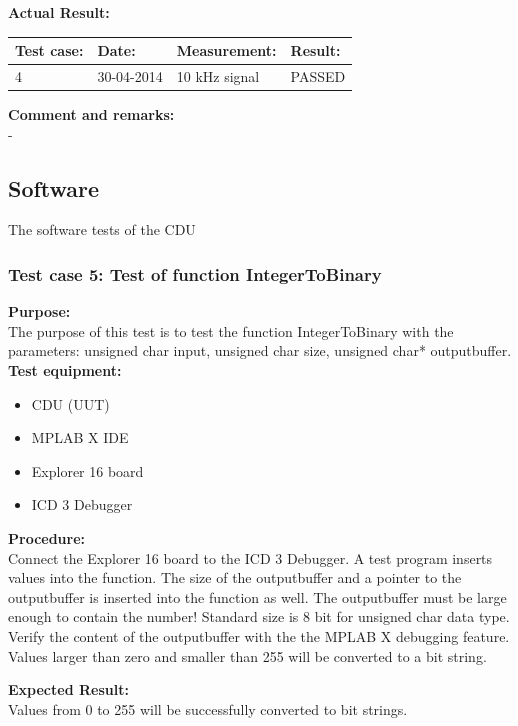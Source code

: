 \textbf{Actual Result:}\\
\begin{table}[H]
\centering
\begin{tabular}{|p{2cm}|p{2cm}|p{3cm}|p{2cm}|}\hline
\textbf{Test case:} & \textbf{Date:} & \textbf{Measurement:} & \textbf{Result:} \\ \hline
4 & 30-04-2014 & 10 kHz signal & PASSED \\ \hline
\end{tabular}
\end{table}

\textbf{Comment and remarks:}\\
-\\

\subsection{Software}
The software tests of the CDU
\subsubsection{Test case 5: Test of function IntegerToBinary }
\textbf{Purpose:}\\
The purpose of this test is to test the function IntegerToBinary with the parameters: unsigned char input, unsigned char size, unsigned char* outputbuffer.\\

\textbf{Test equipment:}
\begin{itemize}
\item CDU (UUT)
\item MPLAB X IDE
\item Explorer 16 board
\item ICD 3 Debugger
\end{itemize}

\textbf{Procedure:}\\
Connect the Explorer 16 board to the ICD 3 Debugger. A test program inserts values into the function. The size of the outputbuffer and a pointer to the outputbuffer is inserted into the function as well. The outputbuffer must be large enough to contain the number! Standard size is 8 bit for unsigned char data type.\\
Verify the content of the outputbuffer with the the MPLAB X debugging feature. Values larger than zero and smaller than 255 will be converted to a bit string. 

\textbf{Expected Result:}\\
Values from 0 to 255  will be successfully converted to bit strings.\\

